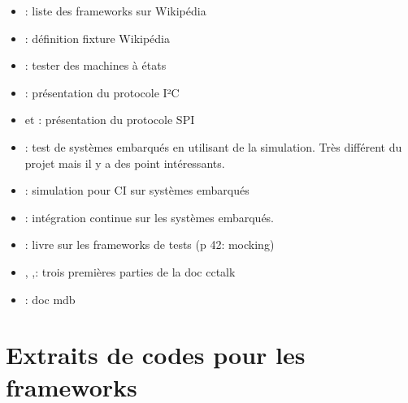 \documentclass[a4paper]{article}
\newcommand\StartAppendixEntries{}
\renewcommand\StartAppendixEntries{\value{tocdepth}=-10000\relax}%
\edef\maintocdepth{\the\value{tocdepth}}%
\renewcommand\StartAppendixEntries{\value{tocdepth}=\maintocdepth\relax}%
\newcommand*\appendixwithtoc{%
  \clearpage
  \appendix
  \addtocontents{toc}{\protect\StartAppendixEntries}
  \listofatoc
}
\begin{document}
\begin{itemize}
  \item \cite{enwikiframeworks}: liste des frameworks sur Wikipédia
  \item \cite{enwikifixtures}: définition fixture Wikipédia
  \item \cite{teststatemachines}: tester des machines à états
  \item \cite{mankar2014review}: présentation du protocole I²C
  \item \cite{dhaker2018introduction} et \cite{li2014design}: présentation du
    protocole SPI
  \item \cite{articleembeddedtests}: test de systèmes embarqués en utilisant de
    la simulation. Très différent du projet mais il y a des point intéressants.
  \item \cite{engblom2015continuous}: simulation pour CI sur systèmes embarqués
  \item \cite{maartensson2016continuous}: intégration continue sur les systèmes
    embarqués.
  \item \cite{hamill2004unit}: livre sur les frameworks de tests (p 42: mocking)
  \item \cite{cctalkpt1}, \cite{cctalkpt2},\cite{cctalkpt3}: trois premières
    parties de la doc cctalk
  \item \cite{mdbdoc}: doc mdb
\end{itemize}

\clearpage{}
\pagestyle{empty}
\printbibliography[keyword={paper},title={Bibliographie}]
\printbibliography[keyword={web},title={Webographie}]

\clearpage
\printglossaries

\appendixwithtoc

\clearpage{}
\section{Extraits de codes pour les frameworks}\label{appendix:frameworks-code}
\end{document}
